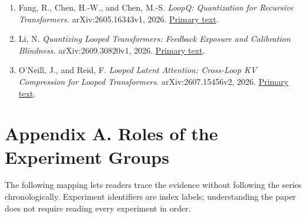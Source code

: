 \documentclass[10pt,a4paper]{article}
\begin{document}
\begin{enumerate}
\item
  Fang, R., Chen, H.-W., and Chen, M.-S. \emph{LoopQ: Quantization for Recursive Transformers.} arXiv:2605.16343v1, 2026. \href{https://arxiv.org/html/2605.16343v1}{Primary text}.
\item
  Li, N. \emph{Quantizing Looped Transformers: Feedback Exposure and Calibration Blindness.} arXiv:2609.30820v1, 2026. \href{https://arxiv.org/html/2609.30820v1}{Primary text}.
\item
  O'Neill, J., and Reid, F. \emph{Looped Latent Attention: Cross-Loop KV Compression for Looped Transformers.} arXiv:2607.15456v2, 2026. \href{https://arxiv.org/html/2607.15456v2}{Primary text}.
\end{enumerate}

\clearpage

\endgroup\section{Appendix A. Roles of the Experiment Groups}\label{appendix-a.-roles-of-the-experiment-groups}

The following mapping lets readers trace the evidence without following the series chronologically. Experiment identifiers are index labels; understanding the paper does not require reading every experiment in order.
\end{document}
